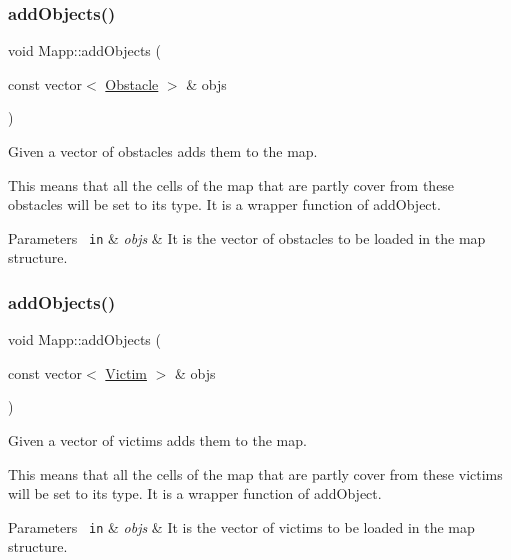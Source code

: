\subsubsection{\texorpdfstring{addObjects()}{addObjects()}\hspace{0.1cm}{\footnotesize\ttfamily [2/4]}}
{\footnotesize\ttfamily void Mapp\+::add\+Objects (\begin{DoxyParamCaption}\item[{const vector$<$ \mbox{\hyperlink{class_obstacle}{Obstacle}} $>$ \&}]{objs }\end{DoxyParamCaption})}



Given a vector of obstacles adds them to the map. 

This means that all the cells of the map that are partly cover from these obstacles will be set to its type. It is a wrapper function of add\+Object.


\begin{DoxyParams}[1]{Parameters}
\mbox{\texttt{ in}}  & {\em objs} & It is the vector of obstacles to be loaded in the map structure. \\
\hline
\end{DoxyParams}
\mbox{\label{class_mapp_a46385479c68f30deb76adbf9a5cff9c3}} 
\subsubsection{\texorpdfstring{addObjects()}{addObjects()}\hspace{0.1cm}{\footnotesize\ttfamily [3/4]}}
{\footnotesize\ttfamily void Mapp\+::add\+Objects (\begin{DoxyParamCaption}\item[{const vector$<$ \mbox{\hyperlink{class_victim}{Victim}} $>$ \&}]{objs }\end{DoxyParamCaption})}



Given a vector of victims adds them to the map. 

This means that all the cells of the map that are partly cover from these victims will be set to its type. It is a wrapper function of add\+Object.


\begin{DoxyParams}[1]{Parameters}
\mbox{\texttt{ in}}  & {\em objs} & It is the vector of victims to be loaded in the map structure. \\
\hline
\end{DoxyParams}
\mbox{\label{class_mapp_a99b3e0e922c4cd5416343ad7e08d8e72}} 
